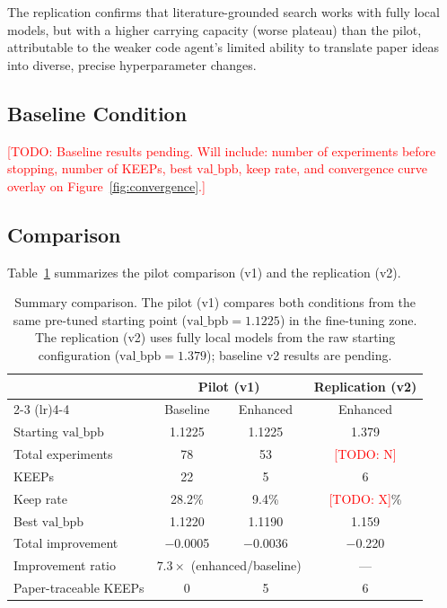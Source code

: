 \documentclass[11pt]{article}
\newcommand{\todo}[1]{\textcolor{red}{[TODO: #1]}}
\newcommand{\val}{\text{val\_bpb}}
\begin{document}
The replication confirms that literature-grounded search works with
fully local models, but with a higher carrying capacity (worse plateau)
than the pilot, attributable to the weaker code agent's limited ability
to translate paper ideas into diverse, precise hyperparameter changes.

\subsection{Baseline Condition}
\label{sec:results-baseline}

\todo{Baseline results pending. Will include: number of experiments
before stopping, number of KEEPs, best $\val$, keep rate, and
convergence curve overlay on Figure~\ref{fig:convergence}.}

\subsection{Comparison}
\label{sec:results-comparison}

Table~\ref{tab:comparison} summarizes the pilot comparison (v1) and the
replication (v2).

\begin{table}[h]
\centering
\caption{Summary comparison. The pilot (v1) compares both conditions
  from the same pre-tuned starting point ($\val = 1.1225$) in the
  fine-tuning zone. The replication (v2) uses fully local models from
  the raw starting configuration ($\val = 1.379$); baseline v2 results
  are pending.}
\label{tab:comparison}
\begin{tabular}{@{}lccc@{}}
\toprule
& \multicolumn{2}{c}{Pilot (v1)} & Replication (v2) \\
\cmidrule(lr){2-3} \cmidrule(lr){4-4}
& Baseline & Enhanced & Enhanced \\
\midrule
Starting $\val$ & 1.1225 & 1.1225 & 1.379 \\
Total experiments & 78 & 53 & \todo{N} \\
KEEPs & 22 & 5 & 6 \\
Keep rate & 28.2\% & 9.4\% & \todo{X}\% \\
Best $\val$ & 1.1220 & 1.1190 & 1.159 \\
Total improvement & $-$0.0005 & $-$0.0036 & $-$0.220 \\
Improvement ratio & \multicolumn{2}{c}{$7.3\times$ (enhanced/baseline)} & --- \\
Paper-traceable KEEPs & 0 & 5 & 6 \\
\bottomrule
\end{tabular}
\end{table}
\end{document}
